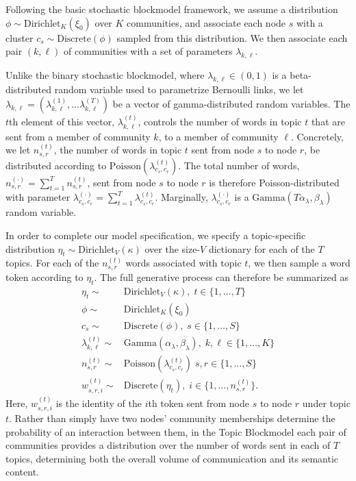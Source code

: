     Following the basic stochastic blockmodel framework, we assume a distribution $\phi\sim \mbox{Dirichlet}_K(\xi_0)$ over $K$ communities, and associate each node $s$ with a cluster $c_s \sim\mbox{Discrete}(\phi)$ sampled from this distribution. We then associate each pair $(k,\ell)$ of communities with a set of parameters $\lambda_{k,\ell}$.
    
    Unlike the binary stochastic blockmodel, where $\lambda_{k,\ell}\in (0,1)$ is a beta-distributed random variable used to parametrize Bernoulli links, we let $\lambda_{k,\ell}=(\lambda_{k,\ell}^{(1)},\dots  \lambda_{k,\ell}^{(T)})$ be a vector of gamma-distributed random variables. The $t$th element of this vector, $\lambda_{k,\ell}^{(t)}$, controls the number of words in topic $t$ that are sent from a member of community $k$, to a member of community $\ell$. Concretely, we let $n_{s,r}^{(t)}$, the number of words in topic $t$ sent from node $s$ to node $r$, be distributed according to $\mbox{Poisson}(\lambda_{c_s,c_r}^{(t)})$. The total number of words, $n_{s,r}^{(\cdot)} = \sum_{t=1}^Tn_{s,r}^{(t)}$, sent from node $s$ to node $r$ is therefore Poisson-distributed with parameter $\lambda_{c_s,c_r}^{(\cdot)}=\sum_{t=1}^T \lambda_{c_s,c_r}^{(t)}$. Marginally, $\lambda_{c_s, c_r}^{(\cdot)}$ is a $\mbox{Gamma}(T\alpha_\lambda, \beta_\lambda)$ random variable.
    
    In order to complete our model specification, we specify a topic-specific distribution $\eta_t \sim \mbox{Dirichlet}_V(\kappa)$ over the size-$V$ dictionary for each of the $T$ topics. For each of the $n_{s,r}^{(t)}$ words associated with topic $t$, we then sample a word token according to $\eta_t$. The full generative process can therefore be summarized as
    \begin{equation}
      \begin{aligned}
        \eta_t \sim& \mbox{Dirichlet}_V(\kappa),\; t\in \{1,\dots,T\}\\
        \phi \sim& \mbox{Dirichlet}_K(\xi_0)\\
        c_s \sim& \mbox{Discrete}(\phi),\; s\in\{1,\dots,S\}\\
        \lambda^{(t)}_{k,\ell}\sim& \mbox{Gamma}(\alpha_\lambda, \beta_\lambda),\; k,\ell \in\{1,\dots, K\}\\
        n_{s,r}^{(t)}\sim& \mbox{Poisson}(\lambda_{c_s,c_r}^{(t)})\; s,r \in\{1,\dots, S\}\\
        w_{s,r,i}^{(t)} \sim& \mbox{Discrete}(\eta_t),\; i\in\{1,\dots, n_{s,r}^{(t)}\}.
      \end{aligned}\label{eqn:PoisForm}
    \end{equation}
    Here, $w_{s,r,i}^{(t)}$ is the identity of the $i$th token sent from node $s$ to node $r$ under topic $t$. Rather than simply have two nodes' community memberships determine the probability of an interaction between them, in the Topic Blockmodel each pair of communities provides a distribution over the number of words sent in each of $T$ topics, determining both the overall volume of communication and its semantic content.
    
